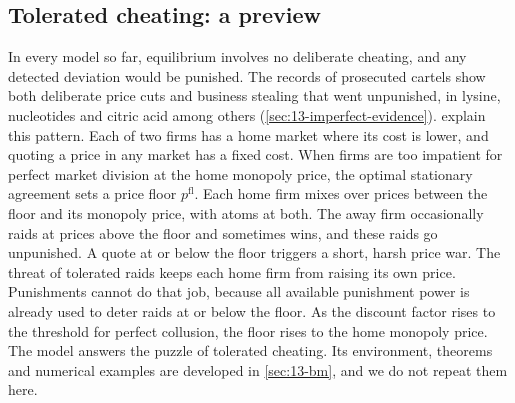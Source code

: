 \subsection{Tolerated cheating: a preview}\label{sec:12-bm-preview}

\begin{remark}\label{rem:12-bm}
In every model so far, equilibrium involves no deliberate cheating, and any detected deviation would be punished.
The records of prosecuted cartels show both deliberate price cuts and business stealing that went unpunished,
in lysine, nucleotides and citric acid among others (\cref{sec:13-imperfect-evidence}).
\citet{BernheimMadsen2017} explain this pattern. Each of two firms has a home market where its cost is lower, and
quoting a price in any market has a fixed cost. When firms are too impatient for perfect market division at the
home monopoly price, the optimal stationary agreement sets a price floor $p^{\mathrm{fl}}$. Each home firm mixes
over prices between the floor and its monopoly price, with atoms at both. The away firm occasionally raids at
prices above the floor and sometimes wins, and these raids go unpunished. A quote at or below the floor triggers a
short, harsh price war. The threat of tolerated raids keeps each home firm from raising its own price. Punishments
cannot do that job, because all available punishment power is already used to deter raids at or below the floor.
As the discount factor rises to the threshold for perfect collusion, the floor rises to the home monopoly price. The model answers the puzzle of tolerated cheating. Its environment, theorems and
numerical examples are developed in \cref{sec:13-bm}, and we do not repeat them here.
\end{remark}
